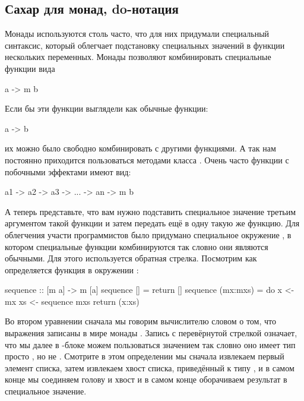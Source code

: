 \subsection{Сахар для монад, do-нотация}

Монады используются столь часто, что для них придумали специальный
синтаксис, который облегчает подстановку специальных значений в функции
нескольких переменных. Монады позволяют комбинировать специальные
функции вида


\begin{code}
a -> m b
\end{code}

Если бы эти функции выглядели как обычные функции:


\begin{code}
a -> b
\end{code}

\noindent 

их можно было свободно комбинировать с другими функциями. А так нам
постоянно приходится пользоваться методами класса . Очень
часто функции с побочными эффектами имеют вид:


\begin{code}
a1 -> a2 -> a3 -> ... -> an -> m b
\end{code}

А теперь представьте, что вам нужно подставить специальное значение
третьим аргументом такой функции и затем передать ещё в одну такую же
функцию. Для облегчения участи программистов было придумано специальное
окружение  , в котором специальные функции
комбинируются так словно они являются обычными. Для этого используется
обратная стрелка. Посмотрим как определяется функция  в
окружении :


\begin{code}
sequence :: [m a] -> m [a]
sequence []         = return []
sequence (mx:mxs)   = do
    x  <- mx
    xs <- sequence mxs
    return (x:xs)
\end{code}

Во втором уравнении сначала мы говорим вычислителю словом  о том,
что выражения записаны в мире монады . Запись с перевёрнутой
стрелкой  означает, что мы далее в -блоке можем
пользоваться значением  так словно оно имеет тип просто , но
не . Смотрите в этом определении мы сначала извлекаем первый
элемент списка, затем извлекаем хвост списка, приведённый к типу
, и в самом конце мы соединяем голову и хвост и в самом конце
оборачиваем результат в специальное значение.


